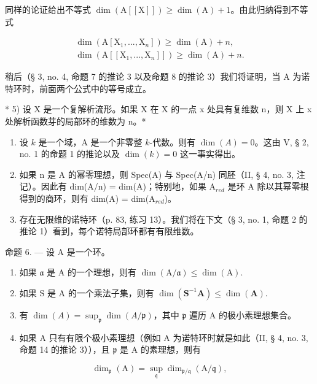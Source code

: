同样的论证给出不等式 \(\dim(\mathrm{A}[[\mathrm{X}]]) \geqslant \dim(\mathrm{A}) + 1\)。由此归纳得到不等式

\[
\begin{array}{l} \dim (\mathrm{A} [ \mathrm{X} _ {1},..., \mathrm{X} _ {n} ]) \geqslant \dim (\mathrm{A}) + n, \\ \dim (\mathrm{A} [ [ \mathrm{X} _ {1},..., \mathrm{X} _ {n} ] ]) \geqslant \dim (\mathrm{A}) + n. \end{array}
\]

稍后（§ 3, no. 4, 命题 7 的推论 3 以及命题 8 的推论 3）我们将证明，当 A 为诺特环时，前面两个公式中的等号成立。

* 5) 设 X 是一个复解析流形。如果 X 在 X 的一点 x 处具有复维数 n，则 X 上 x 处解析函数芽的局部环的维数为 n。*

\begin{enumerate}
\def\labelenumi{\arabic{enumi})}
\setcounter{enumi}{5}
\item
设 \(k\) 是一个域，A 是一个非零整 \(k\)-代数。则有 \(\dim(A) = 0\)。这由 V, § 2, no. 1 的命题 1 的推论以及 \(\dim(k) = 0\) 这一事实得出。
\item
如果 n 是 A 的幂零理想，则 Spec(A) 与 Spec(A/n) 同胚（II, § 4, no. 3, 注记）。因此有 dim(A/n) = dim(A)；特别地，如果 A\(_{red}\) 是环 A 除以其幂零根得到的商环，则有 dim(A) = dim(A\(_{red}\))。
\item
存在无限维的诺特环（p. 83, 练习 13）。我们将在下文（§ 3, no. 1, 命题 2 的推论 1）看到，每个诺特局部环都有有限维数。
\end{enumerate}

命题 6. --- 设 A 是一个环。

\begin{enumerate}
\def\labelenumi{\alph{enumi})}
\item
  如果 \(\mathfrak{a}\) 是 A 的一个理想，则有 \(\dim (\mathrm{A} / \mathfrak{a})\leqslant \dim (\mathrm{A}).\)
\item
  如果 S 是 A 的一个乘法子集，则有 \(\dim (\mathbf{S}^{-1}\mathbf{A})\leqslant \dim (\mathbf{A}).\)
\item
有 \(\dim(A) = \sup_{\mathfrak{p}} \dim(A/\mathfrak{p})\)，其中 \(\mathfrak{p}\) 遍历 A 的极小素理想集合。
\item
如果 A 只有有限个极小素理想（例如 A 为诺特环时就是如此（II, § 4, no. 3, 命题 14 的推论 3）），且 \(\mathfrak{p}\) 是 A 的素理想，则有
\end{enumerate}

\[
\dim_ {\mathfrak {p}} (\mathrm{A}) = \sup _ {\mathfrak {q}} \dim_ {\mathfrak {p} / \mathfrak {q}} (\mathrm{A} / \mathfrak {q}),
\]

